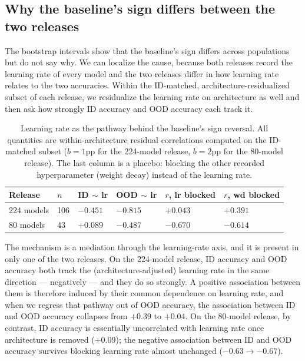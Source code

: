 \documentclass[10pt]{article} %
\begin{document}
\subsection{Why the baseline's sign differs between the two releases}
\label{sub:signmechanism}

The bootstrap intervals show that the baseline's sign differs across populations but do not say why. We can localize the cause, because both releases record the learning rate of every model and the two releases differ in how learning rate relates to the two accuracies. Within the ID-matched, architecture-residualized subset of each release, we residualize the learning rate on architecture as well and then ask how strongly ID accuracy and OOD accuracy each track it.

\begin{table}[t]
\caption{Learning rate as the pathway behind the baseline's sign reversal. All quantities are within-architecture residual correlations computed on the ID-matched subset ($b=1$pp for the 224-model release, $b=2$pp for the 80-model release). The last column is a placebo: blocking the other recorded hyperparameter (weight decay) instead of the learning rate.}
\label{tab:signmech}
\centering
\scriptsize
\setlength{\tabcolsep}{3.5pt}
\begin{tabular}{@{}p{2.4cm}p{1.0cm}p{2.1cm}p{2.1cm}p{2.1cm}p{2.1cm}@{}}
\hline
Release & $n$ & ID $\sim$ lr & OOD $\sim$ lr & $r$, lr blocked & $r$, wd blocked \\
\hline
224 models & 106 & $-0.451$ & $-0.815$ & $+0.043$ & $+0.391$ \\
80 models & 43 & $+0.089$ & $-0.487$ & $-0.670$ & $-0.614$ \\
\hline
\end{tabular}
\end{table}

The mechanism is a mediation through the learning-rate axis, and it is present in only one of the two releases. On the 224-model release, ID accuracy and OOD accuracy both track the (architecture-adjusted) learning rate in the same direction --- negatively --- and they do so strongly. A positive association between them is therefore induced by their common dependence on learning rate, and when we regress that pathway out of OOD accuracy, the association between ID and OOD accuracy collapses from $+0.39$ to $+0.04$. On the 80-model release, by contrast, ID accuracy is essentially uncorrelated with learning rate once architecture is removed ($+0.09$); the negative association between ID and OOD accuracy survives blocking learning rate almost unchanged ($-0.63 \rightarrow -0.67$).
\end{document}
